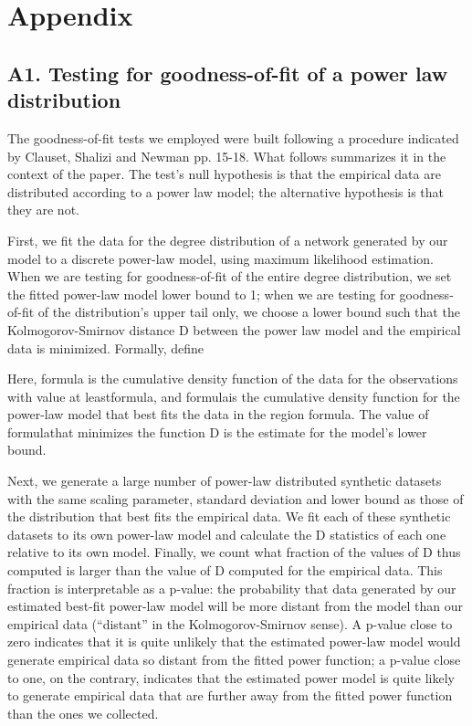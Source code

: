 \section*{Appendix}
\subsection*{A1. Testing for goodness-of-fit of a power law distribution}

The goodness-of-fit tests we employed were built following a procedure indicated by Clauset, Shalizi and Newman \cite{clauset2009power}{pp. 15-18}. What follows summarizes it in the context of the paper. The test's null hypothesis is that the empirical data are distributed according to a power law model; the alternative hypothesis is that they are not.

First, we fit the data for the degree distribution of a network generated by our model to a discrete power-law model, using maximum likelihood estimation. When we are testing for goodness-of-fit of the entire degree distribution, we set the fitted power-law model lower bound to 1; when we are testing for goodness-of-fit of the distribution's upper tail only, we choose a lower bound  such that the Kolmogorov-Smirnov distance D between the power law model and the empirical data is minimized. Formally, define 

Here, formula is the cumulative density function of the data for the observations with value at leastformula, and formulais the cumulative density function for the power-law model that best fits the data in the region formula. The value of formulathat minimizes the function D is the estimate for the model's lower bound.

Next, we generate a large number of power-law distributed synthetic datasets with the same scaling parameter, standard deviation and lower bound as those of the distribution that best fits the empirical data. We fit each of these synthetic datasets to its own power-law model and calculate the D statistics of each one relative to its own model. Finally, we count what fraction of the values of D thus computed is larger than the value of D computed for the empirical data. This fraction is interpretable as a p-value: the probability that data generated by our estimated best-fit power-law model will be more distant from the model than our empirical data (``distant'' in the Kolmogorov-Smirnov sense). A p-value close to zero indicates that it is quite unlikely that the estimated power-law model would generate empirical data so distant from the fitted power function; a p-value close to one, on the contrary, indicates that the estimated power model is quite likely to generate empirical data that are further away from the fitted power function than the ones we collected. 

